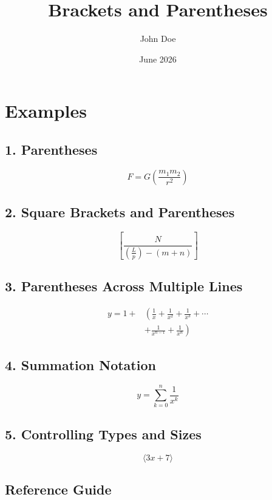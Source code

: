 \documentclass[12pt,letterpaper]{article}
\title{Brackets and Parentheses}
\author{John Doe}
\date{June 2026}
\begin{document}
	
	\maketitle
	
	\section*{Examples}
	
	\subsection*{1. Parentheses}
	
	\[
	F = G \left( \frac{m_1 m_2}{r^2} \right)
	\]
	
	\subsection*{2. Square Brackets and Parentheses}
	
	\[
	\left[
	\frac{N}
	{\left( \frac{L}{p} \right) - (m+n)}
	\right]
	\]
	
	\subsection*{3. Parentheses Across Multiple Lines}
	
	\begin{align*}
		y = 1 + {} &
		\left(
		\frac{1}{x}
		+ \frac{1}{x^2}
		+ \frac{1}{x^3}
		+ \cdots
		\right. \\
		& \left.
		+ \frac{1}{x^{n-1}}
		+ \frac{1}{x^n}
		\right)
	\end{align*}
	
	\subsection*{4. Summation Notation}
	
	\[
	y = \sum_{k=0}^{n} \frac{1}{x^k}
	\]
	
	\subsection*{5. Controlling Types and Sizes}
	
	\[
	\Biggl\langle 3x+7 \Biggr\rangle
	\]
	
	\subsection*{Reference Guide}
	
\end{document}
